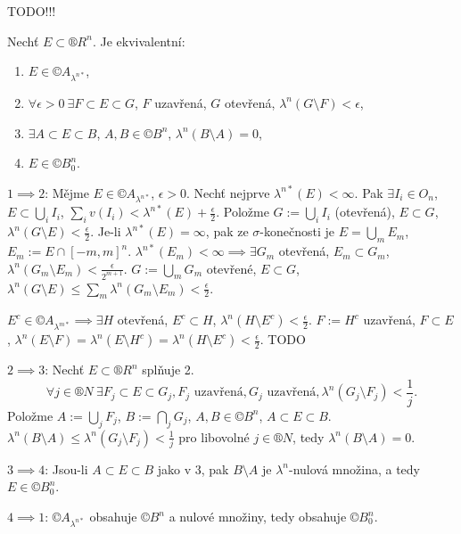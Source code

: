 \documentclass[12pt]{article}					%
\begin{document}

TODO!!!


\begin{veta}
	Nechť $E \subset ®R^n$. Je ekvivalentní:
	
	\begin{enumerate}
		\item $E \in ©A_{\lambda^{n*}}$,
		\item $\forall \epsilon > 0 \ \exists F \subset E \subset G$, $F$ uzavřená, $G$ otevřená, $\lambda^n(G \setminus F) < \epsilon$,
		\item $\exists A \subset E \subset B$, $A, B \in ©B^n$, $\lambda^n(B \setminus A) = 0$,
		\item $E \in ©B_0^n$.
	\end{enumerate}

	\begin{dukazin}
		$1 \implies 2$: Mějme $E \in ©A_{\lambda^{n*}}$, $\epsilon > 0$. Nechť nejprve $\lambda^{n*}(E) < ∞$. Pak $\exists I_i \in O_n$, $E \subset \bigcup_i I_i$, $\sum_i v(I_i) < \lambda^{n*}(E) + \frac{\epsilon}{2}$. Položme $G := \bigcup_i I_i$ (otevřená), $E \subset G$, $\lambda^n(G \setminus E) < \frac{\epsilon}{2}$. Je-li $\lambda^{n*}(E) = ∞$, pak ze $\sigma$-konečnosti je $E = \bigcup_m E_m$, $E_m := E \cap [-m, m]^n$. $\lambda^{n*}(E_m) < ∞ \implies \exists G_m$ otevřená, $E_m \subset G_m$, $\lambda^n(G_m \setminus E_m) < \frac{\epsilon}{2^{m+1}}$. $G := \bigcup_m G_m$ otevřené, $E \subset G$, $\lambda^n(G \setminus E) ≤ \sum_m \lambda^n(G_m \setminus E_m) < \frac{\epsilon}{2}$.

		$E^c \in ©A_{\lambda^{m*}} \implies \exists H$ otevřená, $E^c \subset H$, $\lambda^n(H \setminus E^c) < \frac{\epsilon}{2}$. $F:= H^c$ uzavřená, $F \subset E$, $\lambda^n(E \setminus F) = \lambda^n(E \setminus H^c) = \lambda^n(H \setminus E^c) < \frac{\epsilon}{2}$. TODO

		$2 \implies 3$: Nechť $E \subset ®R^n$ splňuje 2.
		$$ \forall j \in ®N \ \exists F_j \subset E \subset G_j, F_j \text{ uzavřená}, G_j \text{ uzavřená}, \lambda^n(G_j \setminus F_j) < \frac{1}{j}. $$
		Položme $A := \bigcup_j F_j$, $B := \bigcap_j G_j$, $A, B \in ©B^n$, $A \subset E \subset B$. $\lambda^n(B \setminus A)  ≤ \lambda^n(G_j \setminus F_j) < \frac{1}{j}$ pro libovolné $j \in ®N$, tedy $\lambda^n(B \setminus A) = 0$.

		$3 \implies 4$: Jsou-li $A \subset E \subset B$ jako v 3, pak $B \setminus A$ je $\lambda^n$-nulová množina, a tedy $E \in ©B_0^n$.

		$4 \implies 1$: $©A_{\lambda^{n*}}$ obsahuje $©B^n$ a nulové množiny, tedy obsahuje $©B_0^n$.
	\end{dukazin}
\end{veta}
\end{document}
